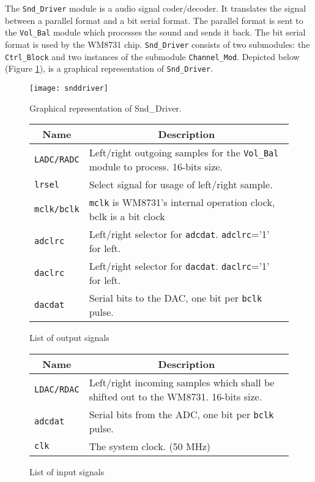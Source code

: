 The \verb?Snd_Driver? module is a audio signal coder/decoder. It translates the signal between a parallel format and a bit serial format. The parallel format is sent to the \verb?Vol_Bal? module which processes the sound and sends it back. The bit serial format is used by the WM8731 chip. \verb?Snd_Driver? consists of two submodules: the \verb?Ctrl_Block? and two instances of the submodule \verb?Channel_Mod?. Depicted below (Figure \ref{fig:snddriver}), is a graphical representation of \verb?Snd_Driver?. 

\begin{figure}[H]
  \centering
  \texttt{[image: snddriver]}
  \caption{Graphical representation of Snd\_Driver.}
  \label{fig:snddriver}
\end{figure}

\begin{figure}[H]
  \centering
  \caption{List of output signals}
  \label{tab:outputs}
    \begin{tabular}{|l|l|}     
      \hline
      \multicolumn{1}{|c|}{Name} & \multicolumn{1}{c|}{Description} \\
      \hline
      \verb=LADC/RADC= & Left/right outgoing samples for the \verb?Vol_Bal? module to process. 16-bits size.\\
      \hline
      \verb=lrsel= & Select signal for usage of left/right sample.\\
      \hline
      \verb=mclk/bclk= & \verb=mclk= is WM8731's internal operation clock, bclk is a bit clock\\
      \hline
      \verb=adclrc= & Left/right selector for \verb=adcdat=. \verb=adclrc==’1’ for left.\\
      \hline
      \verb=daclrc= & Left/right selector for \verb=dacdat=. \verb=daclrc==’1’ for left.\\
      \hline
      \verb=dacdat= & Serial bits to the DAC, one bit per \verb=bclk= pulse.\\
      \hline
    \end{tabular}
\end{figure}

\begin{figure}[H]
  \centering
  \label{tab:inputs}
  \caption{List of input signals}
    \begin{tabular}{|l|l|}     
        \hline
        \multicolumn{1}{|c|}{Name} & \multicolumn{1}{c|}{Description} \\
        \hline
        \verb=LDAC/RDAC= & Left/right incoming samples which shall be shifted out to the WM8731. 16-bits size.\\
        \hline
        \verb=adcdat= & Serial bits from the ADC, one bit per \verb=bclk= pulse.\\
        \hline
        \verb=clk= & The system clock. (50 MHz)\\
        \hline
    \end{tabular}
\end{figure}

